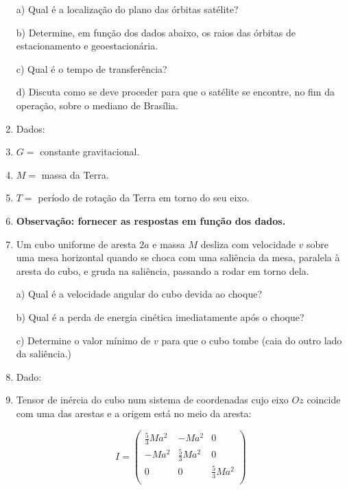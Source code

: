 \begin{enumerate}[start=1,label={\bfseries Q\arabic*.}]
a) Qual é a localização do plano das órbitas satélite?

\resposta

b) Determine, em função dos dados abaixo, os raios das órbitas de estacionamento e geoestacionária.

\resposta

c) Qual é o tempo de transferência?

\resposta

d) Discuta como se deve proceder para que o satélite se encontre, no fim da operação, sobre o mediano de Brasília.

\item[] Dados:
\item[] $G =$ constante gravitacional.
\item[] $M =$ massa da Terra.
\item[] $T =$ período de rotação da Terra em torno do seu eixo.
\item[] \textbf{Observação: fornecer as respostas em função dos dados.}

\resposta



\item Um cubo uniforme de aresta $2a$ e massa $M$ desliza com velocidade $v$ sobre uma mesa horizontal quando se choca com uma saliência da mesa, paralela à aresta do cubo, e gruda na saliência, passando a rodar em torno dela.

a) Qual é a velocidade angular do cubo devida ao choque?

\resposta

b) Qual é a perda de energia cinética imediatamente após o choque?

\resposta

c) Determine o valor mínimo de $v$ para que o cubo tombe (caia do outro lado da saliência.)

\item[] Dado:
\item[] Tensor de inércia do cubo num sistema de coordenadas cujo eixo $Oz$ coincide com uma das arestas e a origem está no meio da aresta:

$$
I = \left(
\begin{array}{ccc}
\frac{5}{3} M a^{2} & -Ma^{2} & 0 \\
- M a^{2} & \frac{5}{3} M a^{2} & 0 \\
0 & 0 & \frac{5}{3} M a^{2} \\
\end{array}
\right)
$$




\end{enumerate}
